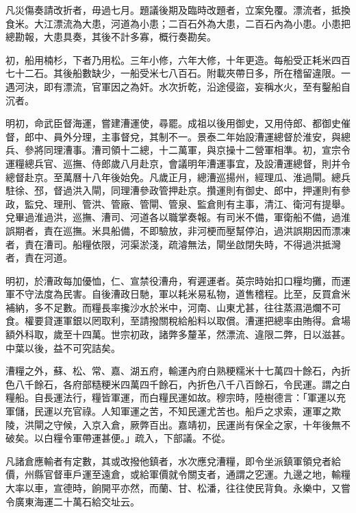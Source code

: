 凡災傷奏請改折者，毋過七月。題議後期及臨時改題者，立案免覆。漂流者，抵換食米。大江漂流為大患，河道為小患；二百石外為大患，二百石內為小患。小患把總勘報，大患具奏，其後不計多寡，概行奏勘矣。

初，船用楠杉，下者乃用松。三年小修，六年大修，十年更造。每船受正耗米四百七十二石。其後船數缺少，一船受米七八百石。附載夾帶日多，所在稽留違限。一遇河決，即有漂流，官軍因之為奸。水次折乾，沿途侵盜，妄稱水火，至有鑿船自沉者。

明初，命武臣督海運，嘗建漕運使，尋罷。成祖以後用御史，又用侍郎、都御史催督，郎中、員外分理，主事督兌，其制不一。景泰二年始設漕運總督於淮安，與總兵、參將同理漕事。漕司領十二總，十二萬軍，與京操十二營軍相準。初，宣宗令運糧總兵官、巡撫、侍郎歲八月赴京，會議明年漕運事宜，及設漕運總督，則并令總督赴京。至萬曆十八年後始免。凡歲正月，總漕巡揚州，經理瓜、淮過閘。總兵駐徐、邳，督過洪入閘，同理漕參政管押赴京。攢運則有御史、郎中，押運則有參政，監兌、理刑、管洪、管廠、管閘、管泉、監倉則有主事，清江、衛河有提舉。兌畢過淮過洪，巡撫、漕司、河道各以職掌奏報。有司米不備，軍衛船不備，過淮誤期者，責在巡撫。米具船備，不即驗放，非河梗而壓幫停泊，過洪誤期因而漂凍者，責在漕司。船糧依限，河渠淤淺，疏濬無法，閘坐啟閉失時，不得過洪抵灣者，責在河道。

明初，於漕政每加優恤，仁、宣禁役漕舟，宥遲運者。英宗時始扣口糧均攤，而運軍不守法度為民害。自後漕政日馳，軍以耗米易私物，道售稽程。比至，反買倉米補納，多不足數。而糧長率攙沙水於米中，河南、山東尤甚，往往蒸濕浥爛不可食。權要貸運軍銀以罔取利，至請撥關稅給船料以取償。漕運把總率由賄得。倉場額外科取，歲至十四萬。世宗初政，諸弊多釐革，然漂流、違限二弊，日以滋甚。中葉以後，益不可究詰矣。

漕糧之外，蘇、松、常、嘉、湖五府，輸運內府白熟粳糯米十七萬四十餘石，內折色八千餘石，各府部糙粳米四萬四千餘石，內折色八千八百餘石，令民運。謂之白糧船。自長運法行，糧皆軍運，而白糧民運如故。穆宗時，陸樹德言：「軍運以充軍儲，民運以充官祿。人知軍運之苦，不知民運尤苦也。船戶之求索，運軍之欺陵，洪閘之守候，入京入倉，厥弊百出。嘉靖初，民運尚有保全之家，十年後無不破矣。以白糧令軍帶運甚便。」疏入，下部議。不從。

凡諸倉應輸者有定數，其或改撥他鎮者，水次應兌漕糧，即令坐派鎮軍領兌者給價，州縣官督車戶運至遠倉，或給軍價就令關支者，通謂之穵運。九邊之地，輸糧大率以車，宣德時，餉開平亦然，而蘭、甘、松潘，往往使民背負。永樂中，又嘗令廣東海運二十萬石給交址云。

